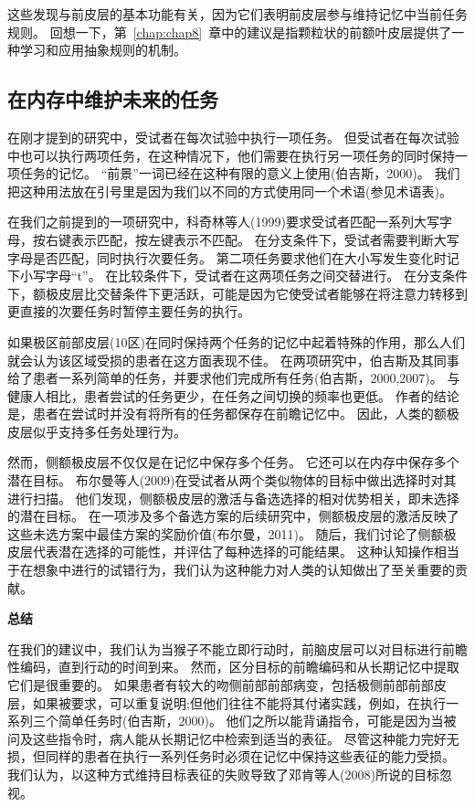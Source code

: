 \par

这些发现与前皮层的基本功能有关，因为它们表明前皮层参与维持记忆中当前任务规则。
回想一下，第~\ref{chap:chap8}~章中的建议是指颗粒状的前额叶皮层提供了一种学习和应用抽象规则的机制。



\subsection{在内存中维护未来的任务}
\par

在刚才提到的研究中，受试者在每次试验中执行一项任务。
但受试者在每次试验中也可以执行两项任务，在这种情况下，他们需要在执行另一项任务的同时保持一项任务的记忆。
“前景”一词已经在这种有限的意义上使用(伯吉斯，2000)。
我们把这种用法放在引号里是因为我们以不同的方式使用同一个术语(参见术语表)。
\par


在我们之前提到的一项研究中，科奇林等人(1999)要求受试者匹配一系列大写字母，按右键表示匹配，按左键表示不匹配。
在分支条件下，受试者需要判断大写字母是否匹配，同时执行次要任务。
第二项任务要求他们在大小写发生变化时记下小写字母“t”。
在比较条件下，受试者在这两项任务之间交替进行。
在分支条件下，额极皮层比交替条件下更活跃，可能是因为它使受试者能够在将注意力转移到更直接的次要任务时暂停主要任务的执行。
\par


如果极区前部皮层(10区)在同时保持两个任务的记忆中起着特殊的作用，那么人们就会认为该区域受损的患者在这方面表现不佳。
在两项研究中，伯吉斯及其同事给了患者一系列简单的任务，并要求他们完成所有任务(伯吉斯，2000,2007)。
与健康人相比，患者尝试的任务更少，在任务之间切换的频率也更低。
作者的结论是，患者在尝试时并没有将所有的任务都保存在前瞻记忆中。
因此，人类的额极皮层似乎支持多任务处理行为。
\par


然而，侧额极皮层不仅仅是在记忆中保存多个任务。
它还可以在内存中保存多个潜在目标。
布尔曼等人(2009)在受试者从两个类似物体的目标中做出选择时对其进行扫描。
他们发现，侧额极皮层的激活与备选选择的相对优势相关，即未选择的潜在目标。
在一项涉及多个备选方案的后续研究中，侧额极皮层的激活反映了这些未选方案中最佳方案的奖励价值(布尔曼，2011)。
随后，我们讨论了侧额极皮层代表潜在选择的可能性，并评估了每种选择的可能结果。
这种认知操作相当于在想象中进行的试错行为，我们认为这种能力对人类的认知做出了至关重要的贡献。
\par



\textbf{总结}
\par
在我们的建议中，我们认为当猴子不能立即行动时，前脑皮层可以对目标进行前瞻性编码，直到行动的时间到来。
然而，区分目标的前瞻编码和从长期记忆中提取它们是很重要的。
如果患者有较大的吻侧前部前部病变，包括极侧前部前部皮层，如果被要求，可以重复说明;但他们往往不能将其付诸实践，例如，在执行一系列三个简单任务时(伯吉斯，2000)。
他们之所以能背诵指令，可能是因为当被问及这些指令时，病人能从长期记忆中检索到适当的表征。
尽管这种能力完好无损，但同样的患者在执行一系列任务时必须在记忆中保持这些表征的能力受损。
我们认为，以这种方式维持目标表征的失败导致了邓肯等人(2008)所说的目标忽视。



